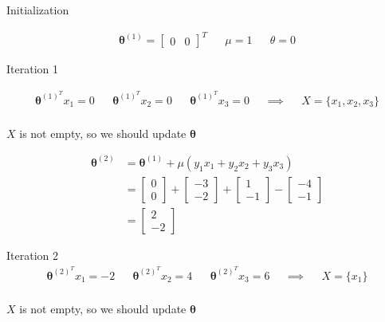 \documentclass[a4paper, 10pt, twoside]{article}
\begin{document}
\begin{enumerate}[a)]
          Initialization

          \begin{align*}
              \bm{\theta}^{(1)} = \begin{bmatrix} 0 & 0\end{bmatrix}^T &  & \mu = 1 &  & \theta = 0
          \end{align*}

          Iteration 1

          \begin{align*}
              \bm{\theta}^{(1)^T} x_1 = 0 &  & \bm{\theta}^{(1)^T} x_2 = 0 &  & \bm{\theta}^{(1)^T} x_3 = 0 &  & \implies &  & X = \{x_1, x_2, x_3 \} \\
          \end{align*}

          $X$ is not empty, so we should update $\bm{\theta}$

          \begin{align*}
              \bm{\theta}^{(2)} & = \bm{\theta}^{(1)} + \mu (y_1 x_1 + y_2 x_2 + y_3 x_3)                                                             \\
                                & = \begin{bmatrix} 0 \\ 0 \end{bmatrix} + \begin{bmatrix} -3 \\ -2 \end{bmatrix} + \begin{bmatrix} 1 \\ -1 \end{bmatrix} - \begin{bmatrix} -4 \\ -1 \end{bmatrix} \\
                                & = \begin{bmatrix} 2 \\ -2 \end{bmatrix}
          \end{align*}

          Iteration 2
          \begin{align*}
              \bm{\theta}^{(2)^T} x_1 = -2 &  & \bm{\theta}^{(2)^T} x_2 = 4 &  & \bm{\theta}^{(2)^T} x_3 = 6 &  & \implies &  & X = \{ x_1 \} \\
          \end{align*}

          $X$ is not empty, so we should update $\bm{\theta}$


\end{enumerate}
\end{document}
